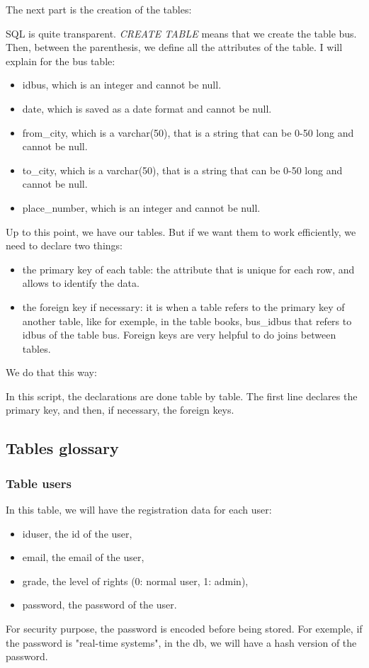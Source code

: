 \documentclass[12pt,a4paper,openany]{book}
\begin{document}
The next part is the creation of the tables:

\bigskip
SQL is quite transparent. \emph{CREATE TABLE} means that we create the table bus. Then, between the parenthesis, we define all the attributes of the table. I will explain for the bus table:
\begin{itemize}
	\item idbus, which is an integer and cannot be null.
	\item date, which is saved as a date format and cannot be null.
	\item from\_city, which is a varchar(50), that is a string that can be 0-50 long and cannot be null.
	\item to\_city, which is a varchar(50), that is a string that can be 0-50 long and cannot be null.
	\item place\_number, which is an integer and cannot be null.
\end{itemize}
Up to this point, we have our tables. But if we want them to work efficiently, we need to declare two things:
\begin{itemize}
	\item the primary key of each table: the attribute that is unique for each row, and allows to identify the data.
	\item the foreign key if necessary: it is when a table refers to the primary key of another table, like for exemple, in the table books, bus\_idbus that refers to idbus of the table bus. Foreign keys are very helpful to do joins between tables.
\end{itemize}
We do that this way:

\bigskip
In this script, the declarations are done table by table. The first line declares the primary key, and then, if necessary, the foreign keys.

\subsection{Tables glossary}
\subsubsection{Table users}
In this table, we will have the registration data for each user:
\begin{itemize}
	\item iduser, the id of the user,
	\item email, the email of the user,
	\item grade, the level of rights (0: normal user, 1: admin),
	\item password, the password of the user.
\end{itemize}
\begin{remarque}
	For security purpose, the password is encoded before being stored. For exemple, if the password is "real-time systems", in the db, we will have a hash version of the password.
\end{remarque}
\end{document}

